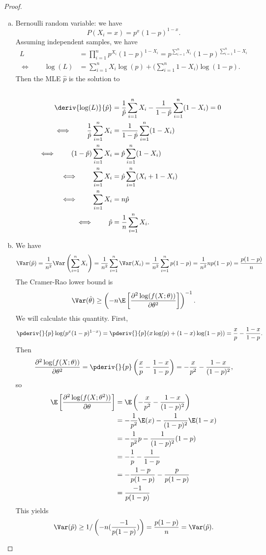 \begin{proof}

\begin{enumerate}[a.]

\item Bernoulli random variable: we have
\[
P(X_i = x) = p^x(1-p)^{1-x}.
\]
Assuming independent samples, we have
\begin{align*}
L & = \prod_{i=1}^n p^{X_i}(1-p)^{1-X_i} = p^{\sum_{i=1}^nX_i}(1-p)^{\sum_{i=1}^n1 - X_i}
\\ \iff \qquad \log(L) & = \sum_{i=1}^nX_i \log(p) + \bigg( \sum_{i=1}^n1 - X_i \bigg) \log(1-p).
\end{align*}
Then the MLE \(\hat{p}\) is the solution to
\begin{align*}
\\  \deriv{\log(L)}{\hat{p}} & = \frac{1}{\hat{p}}\sum_{i=1}^nX_i - \frac{1}{1- \hat{p}} \sum_{i=1}^n (1 - X_i) = 0
\\ \iff \qquad \frac{1}{\hat{p}}\sum_{i=1}^nX_i  & = \frac{1}{1-\hat{p}} \sum_{i=1}^n (1 - X_i)
\\ \iff \qquad (1-\hat{p})\sum_{i=1}^nX_i & = \hat{p} \sum_{i=1}^n (1 - X_i)
\\ \iff \qquad \sum_{i=1}^n X_i  & = \hat{p}\sum_{i=1}^n (X_i + 1 - X_i)
\\ \iff \qquad \sum_{i=1}^n X_i  &= n \hat{p}
\\ \iff \qquad 
\hat{p} & = \frac{1}{n} \sum_{i=1}^n X_i.
\end{align*}

\item 

We have
\[
\Var(\hat{p}) = \frac{1}{n^2} \Var\left( \sum_{i=1}^n X_i\right) = \frac{1}{n^2} \sum_{i=1}^n \Var(X_i) = \frac{1}{n^2} \sum_{i=1}^n p(1-p) = \frac{1}{n^2} n p(1-p) = \frac{p(1-p)}{n}
\]
The Cramer-Rao lower bound is
\[
\Var(\hat{\theta}) \geq \left(-n \E \left[ \frac{\partial^2 \log(f(X; \theta))}{\partial \theta^2} \right] \right)^{-1}.
\]
We will calculate this quantity. First,
\[
\pderiv{}{p} \log(p^x(1-p)^{1-x}) = \pderiv{}{p} (x\log(p) + (1-x)\log(1-p)) = \frac{x}{p} - \frac{1-x}{1-p}.
\]
Then
\[
 \frac{\partial^2 \log(f(X; \theta))}{\partial \theta^2} = \pderiv{}{p} \left(\frac{x}{p} - \frac{1-x}{1-p} \right) = -\frac{x}{p^2} - \frac{1-x}{(1-p)^2},
\]
so
\begin{align*}
\E \left[  \frac{\partial^2 \log(f(X; \theta^2))}{\partial \theta}  \right] & = \E\left(-\frac{x}{p^2} - \frac{1-x}{(1-p)^2} \right) 
\\ & =  -\frac{1}{p^2} \E(x) - \frac{1}{(1-p)^2} \E(1-x) 
\\ & = -\frac{1}{p^2}p - \frac{1}{(1-p)^2}(1 - p)
\\ & = -\frac{1}{p} - \frac{1}{1-p}
\\ &  = -\frac{1-p}{p(1-p)} - \frac{p}{p(1-p)} 
\\ & = \frac{-1}{p(1-p)} 
\end{align*}
This yields
\[
\Var(\hat{p}) \geq 1 / \left( -n( \frac{-1}{p(1-p)}) \right) = \frac{p(1-p)}{n} = \Var(\hat{p}).
\]


\end{enumerate}
\end{proof}
